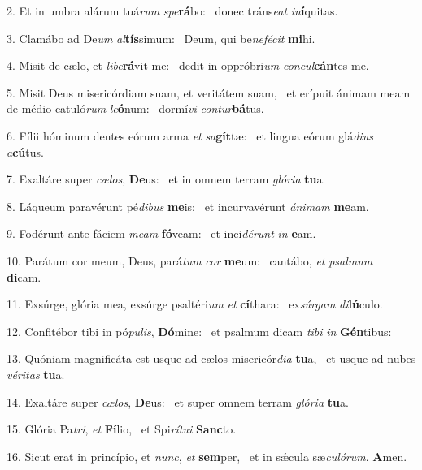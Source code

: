 2. Et in umbra alárum tuá\textit{rum} \textit{spe}\textbf{rá}bo: \ast\  donec tráns\textit{e}\textit{at} \textit{in}\textbf{í}quitas.\

3. Clamábo ad De\textit{um} \textit{al}\textbf{tís}simum: \ast\  Deum, qui be\textit{ne}\textit{fé}\textit{cit} \textbf{mi}hi.\

4. Misit de cælo, et \textit{li}\textit{be}\textbf{rá}vit me: \ast\  dedit in oppróbri\textit{um} \textit{con}\textit{cul}\textbf{cán}tes me.\

5. Misit Deus misericórdiam suam, et veritátem suam, \dag\  et erípuit ánimam meam de médio catuló\textit{rum} \textit{le}\textbf{ó}num: \ast\  dormí\textit{vi} \textit{con}\textit{tur}\textbf{bá}tus.\

6. Fílii hóminum dentes eórum arma \textit{et} \textit{sa}\textbf{gít}tæ: \ast\  et lingua eórum glá\textit{di}\textit{us} \textit{a}\textbf{cú}tus.\

7. Exaltáre super \textit{cæ}\textit{los}, \textbf{De}us: \ast\  et in omnem terram \textit{gló}\textit{ri}\textit{a} \textbf{tu}a.\

8. Láqueum paravérunt pé\textit{di}\textit{bus} \textbf{me}is: \ast\  et incurvavérunt \textit{á}\textit{ni}\textit{mam} \textbf{me}am.\

9. Fodérunt ante fáciem \textit{me}\textit{am} \textbf{fó}veam: \ast\  et inci\textit{dé}\textit{runt} \textit{in} \textbf{e}am.\

10. Parátum cor meum, Deus, pará\textit{tum} \textit{cor} \textbf{me}um: \ast\  cantábo, \textit{et} \textit{psal}\textit{mum} \textbf{di}cam.\

11. Exsúrge, glória mea, exsúrge psaltéri\textit{um} \textit{et} \textbf{cí}thara: \ast\  ex\textit{súr}\textit{gam} \textit{di}\textbf{lú}culo.\

12. Confitébor tibi in pó\textit{pu}\textit{lis}, \textbf{Dó}mine: \ast\  et psalmum dicam \textit{ti}\textit{bi} \textit{in} \textbf{Gén}tibus:\

13. Quóniam magnificáta est usque ad cælos misericór\textit{di}\textit{a} \textbf{tu}a, \ast\  et usque ad nubes \textit{vé}\textit{ri}\textit{tas} \textbf{tu}a.\

14. Exaltáre super \textit{cæ}\textit{los}, \textbf{De}us: \ast\  et super omnem terram \textit{gló}\textit{ri}\textit{a} \textbf{tu}a.\

15. Glória Pa\textit{tri}, \textit{et} \textbf{Fí}lio, \ast\  et Spi\textit{rí}\textit{tu}\textit{i} \textbf{Sanc}to.\

16. Sicut erat in princípio, et \textit{nunc}, \textit{et} \textbf{sem}per, \ast\  et in sǽcula sæ\textit{cu}\textit{ló}\textit{rum}. \textbf{A}men.\

